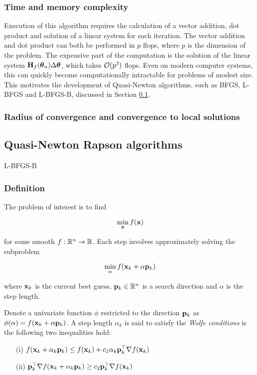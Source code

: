 \documentclass{article}[12pt]
\begin{document}
\subsubsection{Time and memory complexity}

Execution of this algorithm requires the calculation of a vector addition, dot product and solution of a
linear system for each iteration. The vector addition and dot product can both be performed in $p$ flops,
where $p$ is the dimension of the problem. The expensive part of the computation is the solution of the linear
system ${\bf H}_f({\boldsymbol \theta}_n) \Delta {\boldsymbol\theta}$, which takes ${\mathcal O}(p^3)$ flops. Even on modern computer systems, this
can quickly become computationally intractable for problems of modest size. This motivates the development
of Quasi-Newton algorithms, such as BFGS, L-BFGS and L-BFGS-B, discussed in Section \ref{sec:quasi_newton}.

\subsubsection{Radius of convergence and convergence to local solutions}

\subsection{Quasi-Newton Rapson algorithms}
\label{sec:quasi_newton}
L-BFGS-B

\subsubsection{Definition}

The problem of interest is to find

$$
\min_{\bf x} f({\bf x})
$$

for some smooth $f: {\mathbb{R}}^n \to {\mathbb{R}}$. Each step involves approximately solving the subproblem

$$
\min_\alpha f({\bf x}_k + \alpha {\bf p}_k)
$$

where ${\bf x}_k$ is the current best guess, ${\bf p}_k \in {\mathbb{R}}^n$ is a search direction and $\alpha$ is the
step length.

Denote a univariate function $\phi$ restricted to the direction ${\bf p}_k$ as
$\phi(\alpha) = f({\bf x}_k + \alpha {\bf p}_k)$. A step length $\alpha_k$ is said to satisfy the \emph{Wolfe conditions}
is the following two inequalities hold:

\begin{enumerate}
\item[(i)] $f({\bf x}_k + \alpha_k {\bf p}_k) \leq f({\bf x}_k) + c_1 \alpha_k {\bf p}_k^\top \nabla f({\bf x}_k)$ 
\item[(ii)] ${\bf p}_k^\top \nabla f({\bf x}_k + \alpha_k {\bf p}_k) \geq c_2 {\bf p}_k^\top \nabla f({\bf x}_k)$ 
\end{enumerate}
\end{document}
